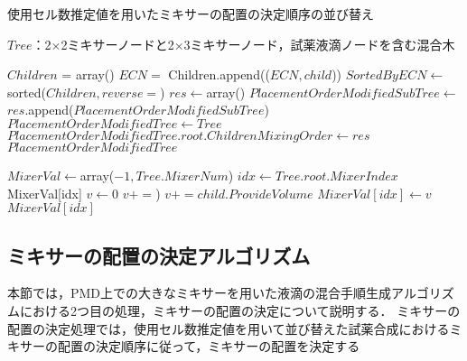 \begin{algorithm}[tbp]
 \caption{使用セル数推定値を用いたミキサーの配置の決定順序の並び替え}\label{alg:ECN}
 \begin{algorithmic}[1]
     \Require $\mathit{Tree}$：2$\times$2ミキサーノードと2$\times$3ミキサーノード，試薬液滴ノードを含む混合木 

        \State $\mathit{Children}$ = array()
            \State $\mathit{ECN}=$ 
            \State Children.append(($\mathit{ECN},child$))
        \EndFor 
        \State $\mathit{SortedByECN} \gets $sorted($Children,reverse=$\True)
        \State $\mathit{res}\gets$array()
            \State $\mathit{PlacementOrderModifiedSubTree}\gets $
            \State $\mathit{res}$.append($\mathit{PlacementOrderModifiedSubTree}$) \EndFor 
        \State $\mathit{PlacementOrderModifiedTree}\gets \mathit{Tree}$ 
        \State $\mathit{PlacementOrderModifiedTree.root.ChildrenMixingOrder}\gets \mathit{res}
        $\Return $\mathit{PlacementOrderModifiedTree}$ 
    \EndFunction 
    
     \State $\mathit{MixerVal}\gets$array($-1,\mathit{Tree.MixerNum}$)
        \Else 
            \State $\mathit{idx}\gets \mathit{Tree.root.MixerIndex}$
            \Return MixerVal[idx]
            \Else 
                \State  $\mathit{v}\gets 0$
                        \State $v+= $)
                    \Else 
                        \State $v+=\mathit{child.ProvideVolume}$
                    \EndIf
                \EndFor 
                \State $\mathit{MixerVal[idx]}\gets v$
                \Return $\mathit{MixerVal[idx]}$
            \EndIf
        \EndIf
    \EndFunction 
 \end{algorithmic}
\end{algorithm}

\newpage

\subsection{ミキサーの配置の決定アルゴリズム}
本節では，PMD上での大きなミキサーを用いた液滴の混合手順生成アルゴリズムにおける2つ目の処理，ミキサーの配置の決定について説明する．
ミキサーの配置の決定処理では，使用セル数推定値を用いて並び替えた試薬合成におけるミキサーの配置の決定順序に従って，ミキサーの配置を決定する

